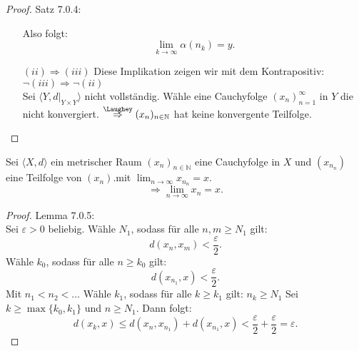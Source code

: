 \begin{proof}{Satz 7.0.4:}
\begin{itemize}
        Also folgt:
        $$
        \lim_{k \to \infty} \alpha(n_k) = y.
        $$
        \item[$(ii) \Rightarrow (iii)$]
        Diese Implikation zeigen wir mit dem Kontrapositiv:
        $\lnot(iii) \Rightarrow \lnot(ii)$\\
        Sei $\langle Y, d\vert_{Y \times Y} \rangle$ nicht vollständig.
        Wähle eine Cauchyfolge $(x_n)_{n=1}^{\infty}$ in $Y$ die nicht konvergiert.
        $\overset{\Laughey}{\Rightarrow} (x_n)_{n\in \mathbb{N}}$ hat keine konvergente Teilfolge.
       
        \end{itemize}
     
\end{proof}

\mlenma{}
{
    Sei $\langle X, d \rangle$ ein metrischer Raum $(x_n)_{n\in \mathbb{N}}$ 
    eine Cauchyfolge in $X$ und $(x_{n_n})$ eine Teilfolge von $(x_n)$.mit $\lim_{n \to \infty} x_{n_n} = x$.
    $$
    \Rightarrow \lim_{n \to \infty} x_n = x.
    $$  
}

\begin{proof}{Lemma 7.0.5:}\\
    Sei $\varepsilon > 0$ beliebig.
    Wähle $N_1$, sodass für alle $n, m \ge N_1$ gilt:
    $$
    d(x_n, x_{m}) < \frac{\varepsilon}{2}.
    $$
    Wähle $k_0$, sodass für alle $n \ge k_0$ gilt:
    $$
    d(x_{n_1}, x) < \frac{\varepsilon}{2}.
    $$
    Mit $n_1 < n_2 < \dots$
    Wähle $k_1$, sodass für alle $k \ge k_1$ gilt: $n_k \ge N_1$
    Sei $k \ge \max\{k_0, k_1\}$ und $n \ge N_1$.  
    Dann folgt:
    $$
    d(x_k, x)
    \leq d(x_n, x_{n_1}) + d(x_{n_1}, x)
    < \frac{\varepsilon}{2} + \frac{\varepsilon}{2}
    = \varepsilon.
    $$
\end{proof}